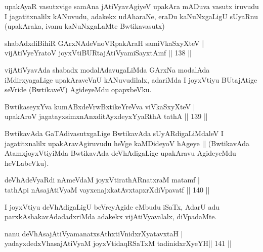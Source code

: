 \begin{artha}
upakAyaR vasutxvige samAna jAtiVyavAgiyeV upakAra mADuva vasutx iruvudu I jagatitxnalilx kANuvudu, adakekx udAharaNe, eraDu kaNuNxgaLigU sUyaRnu (upakAraka, ivanu kaNuNxgaLaMte Bwtikavasutx)
\end{artha}

\begin{shl}
shabAdxdiBihiR GArxNAdeVnoVRpakAraH samiVkaSxyXteV |  \\
vijAtiVyeYratoV joyxVtiBURtajAtiVyamiSayxtAmf \hfill||  138 ||  
\end{shl}

\begin{artha}
vijAtiVyavAda shabadx modalAdavugaLiMda GArxNa modalAda iMdirxyagaLige upakAraveVnU kANuvudilalx, adariMda I joyxVtiyu BUtajAtige seVride (BwtikaveV) AgideyeMdu opapxbeVku.
\end{artha}

\begin{shl}
BwtikaseyxYva kumABxdeVrwBxtikeYreVva viVkaSxyXteV |  \\
upakAroV jagatayxsimxnAnxditAyxdeyxYyaRthA tathA \hfill||  139 ||  
\end{shl}

\begin{artha}
BwtikavAda GaTAdivasutxgaLige BwtikavAda sUyARdigaLiMdaleV I jagatitxnalilx upakAravAgiruvudu heVge kaMDideyoV hAgeye || (BwtikavAda AtamxjoyxVtiyiMda BwtikavAda deVhAdigaLige upakAravu AgideyeMdu heVLabeVku).
\end{artha}


\begin{shl}
deVhAdeVyaRdi nAmeVdaM joyxVtirathARnatxraM matamf |  \\
tathA\s pi nAsajAtiVyaM vayxcnajxkatAvxtapxrXdiVpavatf \hfill||  140 ||  
\end{shl}

\begin{artha}
I joyxVtiyu deVhAdigaLigU beVreyAgide eMbudu iSaTx, AdarU adu parxkAshakavAdadadxriMda adakekx vijAtiVyavalalx, diVpadaMte.
\end{artha}


\begin{shl}
nanu deVhAsajAtiVyamanatxsAthxtiVnidxrXyatavxtaH |  \\
yadayxdedxVhasajAtiVyaM joyxVtidaqRSaTxM tadinidxrXyeYH\hfill ||  141 ||  
\end{shl}


